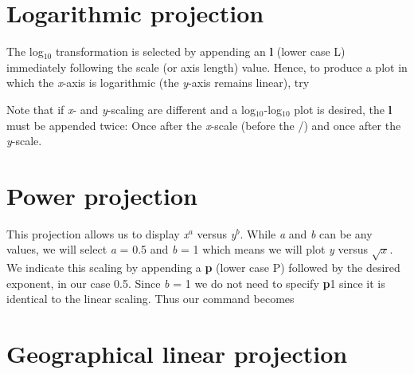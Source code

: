 \section{Logarithmic projection}


The log$_{10}$ transformation is selected by appending an {\bf l}
(lower case L) immediately following the scale (or axis length)
value.  Hence, to produce a plot in which the {\it x}-axis is
logarithmic (the {\it y}-axis remains linear), try 

 

\par Note that if {\it x}- and {\it y}-scaling are different and
a log$_{10}$-log$_{10}$ plot is desired, the {\bf l} must be
appended twice: Once after the {\it x}-scale (before the /) and
once after the {\it y}-scale. 

\section{Power projection}


This projection allows us to display {\it x$^a$} versus {\it y$^b$}.
While {\it a} and {\it b} can be any values, we will select {\it a}
= 0.5 and {\it b} = 1 which means we will plot {\it y} versus $\sqrt{x}$.
We indicate this scaling by appending a {\bf p} (lower case P) followed
by the desired exponent, in our case 0.5.  Since {\it b} = 1 we do not
need to specify {\bf p}1 since it is identical to the linear scaling.
Thus our command becomes

 

\section{Geographical linear projection}
\label{sec:linear}


